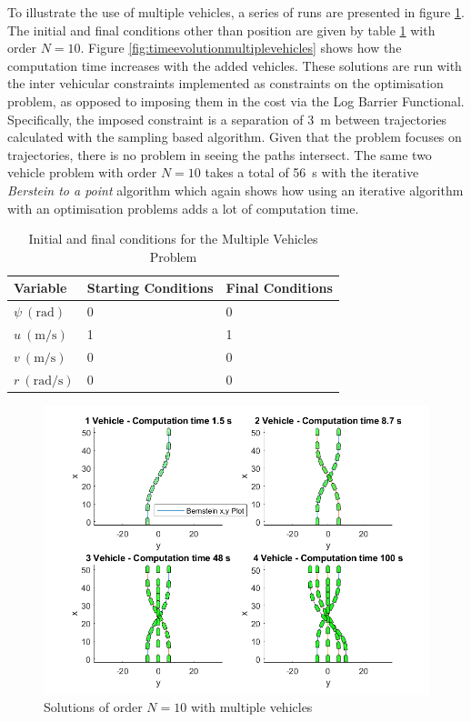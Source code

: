 \par To illustrate the use of multiple vehicles, a series of runs are presented in figure \ref{fig:multiplevehicles}. The initial and final conditions other than position are given by table \ref{tab:multivehconditions} with order $N=10$. Figure \ref{fig:timeevolutionmultiplevehicles} shows how the computation time increases with the added vehicles. These solutions are run with the inter vehicular constraints implemented as constraints on the optimisation problem, as opposed to imposing them in the cost via the Log Barrier Functional. Specifically, the imposed constraint is a separation of \SI{3}{\meter} between trajectories calculated with the sampling based algorithm. Given that the problem focuses on trajectories, there is no problem in seeing the paths intersect. The same two vehicle problem with order $N=10$ takes a total of \SI{56}{\second} with the iterative \textit{Berstein to a point} algorithm which again shows how using an iterative algorithm with an optimisation problems adds a lot of computation time.
\begin{table}[h!]
\centering
\begin{tabular}{|l|l|l|}
\hline
Variable & Starting Conditions & Final Conditions \\ \hline
$\psi\ (\si{\radian})$ & 0 & 0 \\
$u\ (\si{\meter\per\second})$ & 1 & 1 \\
$v\ (\si{\meter\per\second})$ & 0 & 0 \\
$r\ (\si{\radian\per\second})$ & 0 & 0 \\
\hline
\end{tabular}
\caption{Initial and final conditions for the Multiple Vehicles Problem}
\label{tab:multivehconditions}
\end{table}



\begin{figure}[h!]
\centering
\includegraphics[width=\textwidth]{Images/results/multiplevehicles.png}
\caption{Solutions of order $N=10$ with multiple vehicles}
\label{fig:multiplevehicles}
\end{figure}

